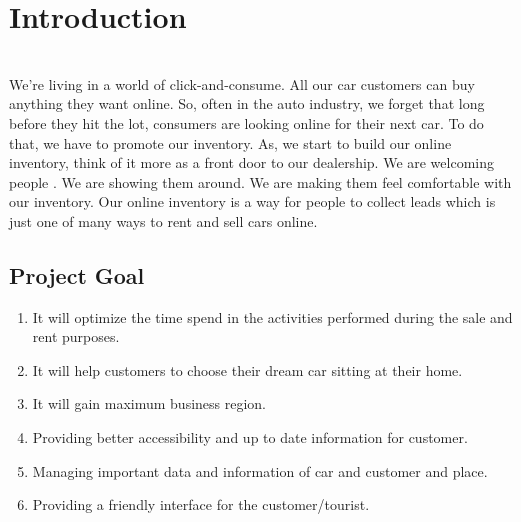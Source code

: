 \documentclass[10pt,twosides]{report}
\begin{document}
 \tableofcontents
 
\listoffigures

\listoftables

\newpage

\setcounter{chapter}{0}
 
 \chapter{Introduction}

\textbf{}\\
We’re living in a world of click-and-consume. All our car customers can buy anything they want online. So, often in the auto industry, we forget that long before they hit the lot, consumers are looking online for their next car. To do that, we have to promote our inventory. As, we start to build our online inventory, think of it more as a front door to our dealership. We are welcoming people . We are showing them around. We are making them feel comfortable with our inventory. Our online inventory is a way for people to collect leads which is just one of many ways to rent and sell cars online. \\



\noindent 

\noindent 
\section{   Project Goal}

\noindent 



\begin{enumerate}
\item         It will optimize the time spend in the activities performed during the sale and rent purposes.

\item 	It will help customers to choose their dream car sitting at their home.

\item 	It will gain maximum business region.

\item        Providing better accessibility and up to date information for customer.

\item        Managing important data and information of car and customer and place.

\item	       Providing a friendly interface for the customer/tourist.
\end{enumerate}
\end{document}
